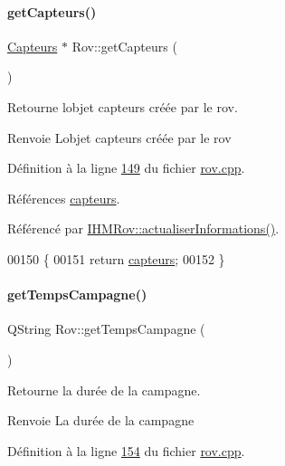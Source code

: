 \paragraph{\texorpdfstring{get\+Capteurs()}{getCapteurs()}}
{\footnotesize\ttfamily \hyperlink{class_capteurs}{Capteurs} $\ast$ Rov\+::get\+Capteurs (\begin{DoxyParamCaption}{ }\end{DoxyParamCaption})}



Retourne l\textquotesingle{}objet capteurs créée par le rov. 

\begin{DoxyReturn}{Renvoie}
L\textquotesingle{}objet capteurs créée par le rov 
\end{DoxyReturn}


Définition à la ligne \hyperlink{rov_8cpp_source_l00149}{149} du fichier \hyperlink{rov_8cpp_source}{rov.\+cpp}.



Références \hyperlink{rov_8h_source_l00095}{capteurs}.



Référencé par \hyperlink{ihmrov_8cpp_source_l00110}{I\+H\+M\+Rov\+::actualiser\+Informations()}.


\begin{DoxyCode}
00150 \{
00151     \textcolor{keywordflow}{return} \hyperlink{class_rov_a1b34d63d505da660be27b75ad93754c3}{capteurs};
00152 \}
\end{DoxyCode}
\mbox{\label{class_rov_aa977585d4377a57281004fd57208635a}} 
\paragraph{\texorpdfstring{get\+Temps\+Campagne()}{getTempsCampagne()}}
{\footnotesize\ttfamily Q\+String Rov\+::get\+Temps\+Campagne (\begin{DoxyParamCaption}{ }\end{DoxyParamCaption})}



Retourne la durée de la campagne. 

\begin{DoxyReturn}{Renvoie}
La durée de la campagne 
\end{DoxyReturn}


Définition à la ligne \hyperlink{rov_8cpp_source_l00154}{154} du fichier \hyperlink{rov_8cpp_source}{rov.\+cpp}.



